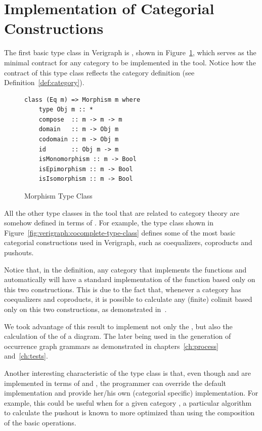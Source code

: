 \section{Implementation of Categorial Constructions}

The first basic type class in Verigraph is , shown in Figure~\ref{fig:verigraph:morphism-type-class}, which serves as the minimal contract for any category to be implemented in the tool. Notice how the contract of this type class reflects the category definition (see Definition~\ref{def:category}).

\begin{figure}[!ht]
\caption{Morphism Type Class}
\begin{verbatim}
class (Eq m) => Morphism m where
    type Obj m :: *
    compose  :: m -> m -> m
    domain   :: m -> Obj m
    codomain :: m -> Obj m
    id       :: Obj m -> m
    isMonomorphism :: m -> Bool
    isEpimorphism :: m -> Bool
    isIsomorphism :: m -> Bool
\end{verbatim}
\label{fig:verigraph:morphism-type-class}
\end{figure}

All the other type classes in the tool that are related to category theory are somehow defined in terms of . For example, the  type class shown in Figure~\ref{fig:verigraph:cocomplete-type-class} defines some of the most basic categorial constructions used in Verigraph, such as coequalizers, coproducts and pushouts.

Notice that, in the  definition, any category that implements the functions  and  automatically will have a standard implementation of the  function based only on this two constructions. This is due to the fact that, whenever a category has coequalizers and coproducts, it is possible to calculate any (finite) colimit based only on this two constructions, as demonstrated in~\cite{Pierce1991}.

We took advantage of this result to implement not only the , but also the calculation of the  of a diagram. The later being used in the generation of occurrence graph grammars as demonstrated in chapters~\ref{ch:process} and~\ref{ch:tests}.

Another interesting characteristic of the  type class is that, even though  and  are implemented in terms of  and , the programmer can override the default implementation and provide her/his own (categorial specific) implementation. For example, this could be useful when for a given category , a particular algorithm to calculate the pushout is known to more optimized than using the composition of the basic operations.

